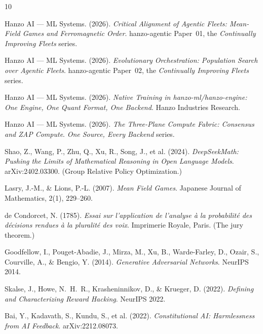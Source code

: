 \documentclass[11pt]{article}
\theoremstyle{definition}
\theoremstyle{remark}
\begin{document}
\begin{thebibliography}{10}

Hanzo AI --- ML Systems. (2026).
\textit{Critical Alignment of Agentic Fleets: Mean-Field Games and Ferromagnetic Order}.
hanzo-agentic Paper~01, the \emph{Continually Improving Fleets} series.

Hanzo AI --- ML Systems. (2026).
\textit{Evolutionary Orchestration: Population Search over Agentic Fleets}.
hanzo-agentic Paper~02, the \emph{Continually Improving Fleets} series.

Hanzo AI --- ML Systems. (2026).
\textit{Native Training in hanzo-ml/hanzo-engine: One Engine, One Quant Format, One Backend}.
Hanzo Industries Research.

Hanzo AI --- ML Systems. (2026).
\textit{The Three-Plane Compute Fabric: Consensus and ZAP Compute}.
\emph{One Source, Every Backend} series.

Shao, Z., Wang, P., Zhu, Q., Xu, R., Song, J., et al. (2024).
\textit{DeepSeekMath: Pushing the Limits of Mathematical Reasoning in Open Language Models}.
arXiv:2402.03300. (Group Relative Policy Optimization.)

Lasry, J.-M., \& Lions, P.-L. (2007).
\textit{Mean Field Games}.
Japanese Journal of Mathematics, 2(1), 229--260.

de Condorcet, N. (1785).
\textit{Essai sur l'application de l'analyse \`a la probabilit\'e des d\'ecisions rendues \`a la pluralit\'e des voix}.
Imprimerie Royale, Paris. (The jury theorem.)

Goodfellow, I., Pouget-Abadie, J., Mirza, M., Xu, B., Warde-Farley, D., Ozair, S., Courville, A., \& Bengio, Y. (2014).
\textit{Generative Adversarial Networks}.
NeurIPS 2014.

Skalse, J., Howe, N.~H.~R., Krasheninnikov, D., \& Krueger, D. (2022).
\textit{Defining and Characterizing Reward Hacking}.
NeurIPS 2022.

Bai, Y., Kadavath, S., Kundu, S., et al. (2022).
\textit{Constitutional AI: Harmlessness from AI Feedback}.
arXiv:2212.08073.

\end{thebibliography}
\end{document}
